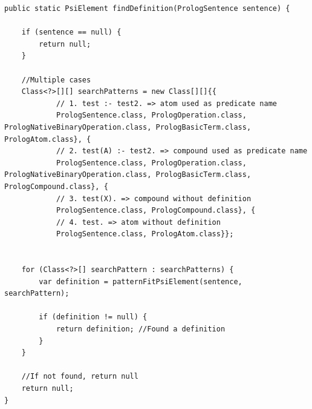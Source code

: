 \begin{lstlisting}[label={lst:method_find_predicate_in_sentence}, caption={Méthode permettant d'extraire le prédicat défini dans la "PrologSentence"}]
public static PsiElement findDefinition(PrologSentence sentence) {

    if (sentence == null) {
        return null;
    }

    //Multiple cases
    Class<?>[][] searchPatterns = new Class[][]{{
            // 1. test :- test2. => atom used as predicate name
            PrologSentence.class, PrologOperation.class, PrologNativeBinaryOperation.class, PrologBasicTerm.class, PrologAtom.class}, {
            // 2. test(A) :- test2. => compound used as predicate name
            PrologSentence.class, PrologOperation.class, PrologNativeBinaryOperation.class, PrologBasicTerm.class, PrologCompound.class}, {
            // 3. test(X). => compound without definition
            PrologSentence.class, PrologCompound.class}, {
            // 4. test. => atom without definition
            PrologSentence.class, PrologAtom.class}};


    for (Class<?>[] searchPattern : searchPatterns) {
        var definition = patternFitPsiElement(sentence, searchPattern);

        if (definition != null) {
            return definition; //Found a definition
        }
    }

    //If not found, return null
    return null;
}
\end{lstlisting}

